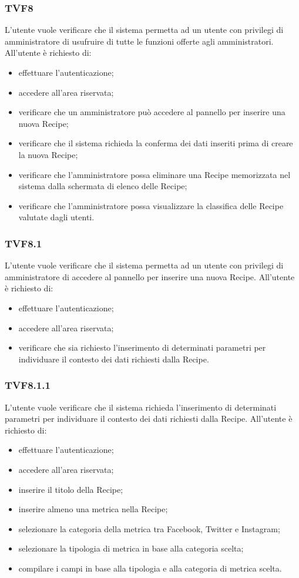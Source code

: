 		\subsubsection{TVF8}
			L'utente vuole verificare che il sistema permetta ad un utente con privilegi di amministratore di usufruire di tutte le funzioni offerte agli amministratori. All'utente è richiesto di:
			\begin{itemize}
				\item effettuare l'autenticazione;
				\item accedere all'area riservata;
				\item verificare che un amministratore può accedere al pannello per inserire una nuova Recipe;
				\item verificare che il sistema richieda la conferma dei dati inseriti prima di creare la nuova Recipe;
				\item verificare che l'amministratore possa eliminare una Recipe memorizzata nel sistema dalla schermata di elenco delle Recipe;
				\item verificare che l'amministratore possa visualizzare la classifica delle Recipe valutate dagli utenti.
			\end{itemize}
			
		\subsubsection{TVF8.1}
			L'utente vuole verificare che il sistema permetta ad un utente con privilegi di amministratore di accedere al pannello per inserire una nuova Recipe. All'utente è richiesto di:
			\begin{itemize}
				\item effettuare l'autenticazione;
				\item accedere all'area riservata;
				\item verificare che sia richiesto l'inserimento di determinati parametri per individuare il contesto dei dati richiesti dalla Recipe.
			\end{itemize}
			
		\subsubsection{TVF8.1.1}
			L'utente vuole verificare che il sistema richieda l'inserimento di determinati parametri per individuare il contesto dei dati richiesti dalla Recipe. All'utente è richiesto di:
			\begin{itemize}
				\item effettuare l'autenticazione;
				\item accedere all'area riservata;
				\item inserire il titolo della Recipe;
				\item inserire almeno una metrica nella Recipe;
				\item selezionare la categoria della metrica tra Facebook, Twitter e Instagram;
				\item selezionare la tipologia di metrica in base alla categoria scelta;
				\item compilare i campi in base alla tipologia e alla categoria di metrica scelta. 
			\end{itemize}
			
